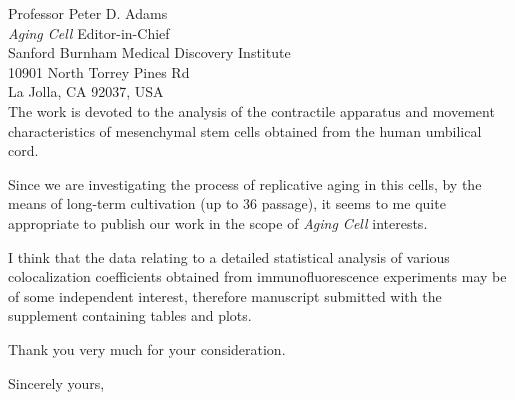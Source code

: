 \documentclass[11pt]{letter} %
\begin{document}
\begin{letter}{
Professor Peter D. Adams \\
\emph{Aging Cell} Editor-in-Chief \\
Sanford Burnham Medical Discovery Institute \\
10901 North Torrey Pines Rd \\
La Jolla, CA 92037, USA\\}
The work is devoted to the analysis of the contractile apparatus and movement characteristics of mesenchymal stem cells obtained from the human umbilical cord.

Since we are investigating the process of replicative aging in this cells, by the means of long-term cultivation (up to 36 passage), it seems to me quite appropriate to publish our work in the scope of \emph{Aging Cell} interests.

I think that the data relating to a detailed statistical analysis of various colocalization coefficients obtained from immunofluorescence experiments may be of some independent interest, therefore manuscript submitted with the supplement containing tables and plots.

Thank you very much for your consideration.

\closing{Sincerely yours, }




\end{letter}
\end{document}

